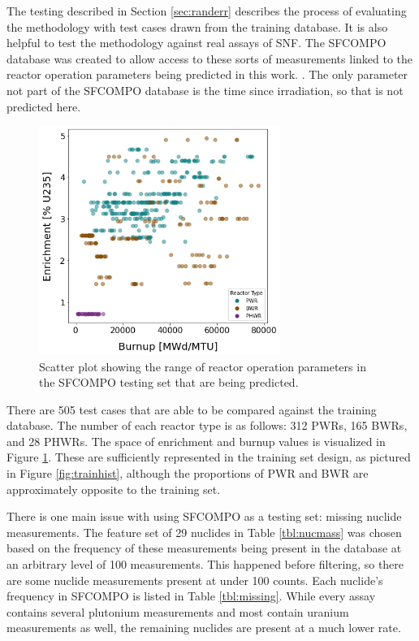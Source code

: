
The testing described in Section \ref{sec:randerr} describes the process of
evaluating the methodology with test cases drawn from the training database.
It is also helpful to test the methodology against real assays of \gls{SNF}.
The \gls{SFCOMPO} database was created to allow access to these sorts of
measurements linked to the reactor operation parameters being predicted in this
work. \cite{sfcompo}. The only parameter not part of the \gls{SFCOMPO} database
is the time since irradiation, so that is not predicted here. 

\begin{figure}[!htb]
  \centering
  \includegraphics[width=0.7\textwidth]{./chapters/exp1/sfcompo_scatter_viz.png}
  \caption{Scatter plot showing the range of reactor operation parameters in 
           the \gls{SFCOMPO} testing set that are being predicted.}
  \label{fig:sfcoscatter}
\end{figure}

There are 505 test cases that are able to be compared against the training
database.  The number of each reactor type is as follows: 312 \gls{PWR}s, 165
\gls{BWR}s, and 28 \gls{PHWR}s. The space of enrichment and burnup values is
visualized in Figure \ref{fig:sfcoscatter}. These are sufficiently represented
in the training set design, as pictured in Figure \ref{fig:trainhist}, although
the proportions of \gls{PWR} and \gls{BWR} are approximately opposite to the
training set.

There is one main issue with using \gls{SFCOMPO} as a testing set: missing
nuclide measurements.  The feature set of 29 nuclides in Table
\ref{tbl:nucmass} was chosen based on the frequency of these measurements being
present in the database at an arbitrary level of 100 measurements. This
happened before filtering, so there are some nuclide measurements present at
under 100 counts.  Each nuclide's frequency in \gls{SFCOMPO} is listed in Table
\ref{tbl:missing}.  While every assay contains several plutonium measurements
and most contain uranium measurements as well, the remaining nuclides are
present at a much lower rate. 

